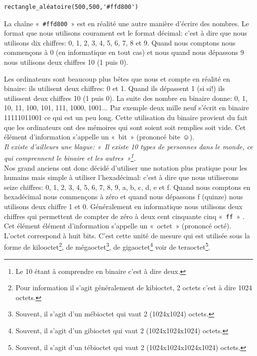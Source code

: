 \begin{Verbatim}[frame=single,rulecolor=\color{mbleu}, label=à taper]
rectangle_aléatoire(500,500,'#ffd800')
\end{Verbatim}

La chaîne «~\texttt{\#ffd800}~» est en réalité une autre manière d'écrire des nombres.
Le format que nous utilisons courament est le format décimal: c'est à dire que nous utilisons dix chiffres: 0, 1, 2, 3, 4, 5, 6, 7, 8 et 9. Quand nous comptons nous commençons à 0 (en informatique en tout cas) et nous quand nous dépassons 9 nous utilisons deux chiffres 10 (1 puis 0).

Les ordinateurs sont beaucoup plus bêtes que nous et compte en réalité en binaire: ils utilisent deux chiffres: 0 et 1. Quand ils dépassent 1 (si si!) ils utilissent deux chiffres 10 (1 puis 0). La suite des nombre en binaire donne: 0, 1, 10, 11, 100, 101, 111, 1000, 1001... Par exemple deux mille neuf s'écrit en binaire 11111011001 ce qui est un peu long. Cette utilisation du binaire provient du fait que les ordinateurs ont des mémoires qui sont soient soit remplies soit vide. Cet élément d'information s'appelle un «~bit~» (prononcé bite ☺).\\

\emph{Il existe d'ailleurs une blague: «~Il existe \emph{10} types de personnes dans le monde, ce qui comprennent le binaire et les autres~»\footnote{Le 10 étant à comprendre en binaire c'est à dire deux.}.}\\


Nos grand anciens ont donc décidé d'utiliser une notation plus pratique pour les humains mais simple à utiliser l'hexadécimal: c'est à dire que nous utiliserons seize chiffres: 0, 1, 2, 3, 4, 5, 6, 7, 8, 9, a, b, c, d, e et f. Quand nous comptons en hexadécimal nous commençons à zéro et quand nous dépassons f (quinze) nous utilisons deux chiffre 1 et 0. Généralement en informatique nous utilisons deux chiffres qui permettent de compter de zéro à deux cent cinquante cinq «~\texttt{ff}~» .
Cet élément élément d'information s'appelle un «~octet~» (prononcé octé). L'octet correspond à huit bits. C'est cette unité de mesure qui est utilisée sous la forme de kilooctet\footnote{Pour information il s'agit généralement de kibioctet, 2 octets c'est à dire 1024 octets.}, de mégaoctet\footnote{Souvent, il s'agit d'un mébioctet qui vaut 2 (1024\textsf{x}1024) octets.}, de gigaoctet\footnote{Souvent, il s'agit d'un gibioctet qui vaut 2 (1024\textsf{x}1024\textsf{x}1024) octets.} voir de teraoctet\footnote{Souvent, il s'agit d'un tébioctet qui vaut 2 (1024\textsf{x}1024\textsf{x}1024\textsf{x}1024) octets.}.

